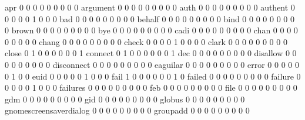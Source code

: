 \documentclass[compress,8pt]{beamer}
\begin{document}
\begin{frame}
\begin{Schunk}
  apr                                        0   0   0   0   0   0   0   0   0
  argument                                   0   0   0   0   0   0   0   0   0
  auth                                       0   0   0   0   0   0   0   0   0
  authent                                    0   0   0   0   0   1   0   0   0
  bad                                        0   0   0   0   0   0   0   0   0
  behalf                                     0   0   0   0   0   0   0   0   0
  bind                                       0   0   0   0   0   0   0   0   0
  brown                                      0   0   0   0   0   0   0   0   0
  bye                                        0   0   0   0   0   0   0   0   0
  cadi                                       0   0   0   0   0   0   0   0   0
  chan                                       0   0   0   0   0   0   0   0   0
  chang                                      0   0   0   0   0   0   0   0   0
  check                                      0   0   0   0   1   0   0   0   0
  clark                                      0   0   0   0   0   0   0   0   0
  close                                      0   1   0   0   0   0   0   0   1
  connect                                    0   1   0   0   0   0   0   0   1
  dec                                        0   0   0   0   0   0   0   0   0
  disallow                                   0   0   0   0   0   0   0   0   0
  disconnect                                 0   0   0   0   0   0   0   0   0
  eaguilar                                   0   0   0   0   0   0   0   0   0
  error                                      0   0   0   0   0   0   1   0   0
  euid                                       0   0   0   0   0   1   0   0   0
  fail                                       1   0   0   0   0   0   0   1   0
  failed                                     0   0   0   0   0   0   0   0   0
  failure                                    0   0   0   0   0   1   0   0   0
  failures                                   0   0   0   0   0   0   0   0   0
  feb                                        0   0   0   0   0   0   0   0   0
  file                                       0   0   0   0   0   0   0   0   0
  gdm                                        0   0   0   0   0   0   0   0   0
  gid                                        0   0   0   0   0   0   0   0   0
  globus                                     0   0   0   0   0   0   0   0   0
  gnomescreensaverdialog                     0   0   0   0   0   0   0   0   0
  groupadd                                   0   0   0   0   0   0   0   0   0

\end{Schunk}
\end{frame}
\end{document}
